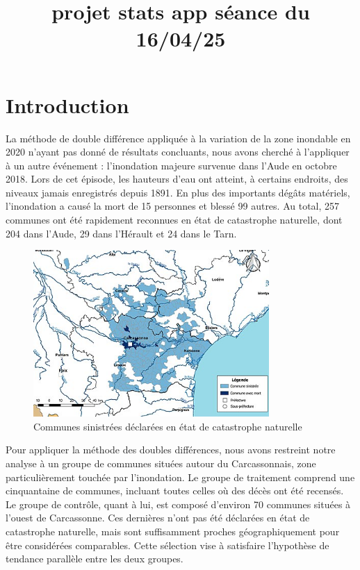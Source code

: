 \documentclass[a4paper,12pt]{article}
\begin{document}
\title{\textbf{projet stats app séance du 16/04/25}}
\maketitle


\section{Introduction}

La méthode de double différence appliquée à la variation de la zone inondable en 2020 n’ayant pas donné de résultats concluants, nous avons cherché à l’appliquer à un autre événement : l’inondation majeure survenue dans l’Aude en octobre 2018. Lors de cet épisode, les hauteurs d’eau ont atteint, à certains endroits, des niveaux jamais enregistrés depuis 1891. En plus des importants dégâts matériels, l’inondation a causé la mort de 15 personnes et blessé 99 autres. Au total, 257 communes ont été rapidement reconnues en état de catastrophe naturelle, dont 204 dans l’Aude, 29 dans l’Hérault et 24 dans le Tarn. \newline

\begin{figure}[ht]
    \centering
    \includegraphics[width=0.8\textwidth]{Crue-oct18-Catnat.jpg}
    \caption{Communes sinistrées déclarées en état de catastrophe naturelle}
    \label{fig:mon_image}
\end{figure}

Pour appliquer la méthode des doubles différences, nous avons restreint notre analyse à un groupe de communes situées autour du Carcassonnais, zone particulièrement touchée par l’inondation. Le groupe de traitement comprend une cinquantaine de communes, incluant toutes celles où des décès ont été recensés. Le groupe de contrôle, quant à lui, est composé d’environ 70 communes situées à l’ouest de Carcassonne. Ces dernières n’ont pas été déclarées en état de catastrophe naturelle, mais sont suffisamment proches géographiquement pour être considérées comparables. Cette sélection vise à satisfaire l’hypothèse de tendance parallèle entre les deux groupes. \newline
\end{document}

